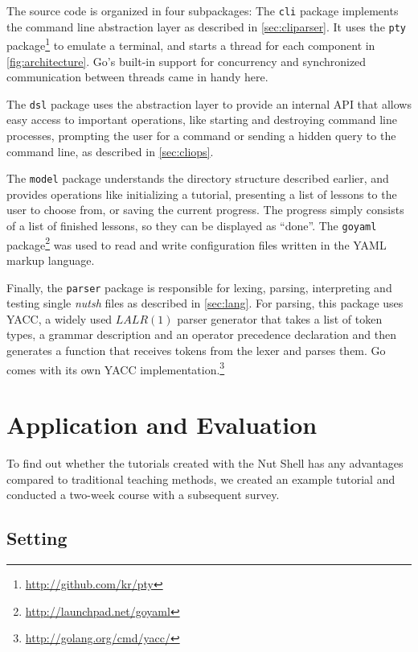 \documentclass[paper=a4,twoside,abstract=on,cleardoublepage=empty,numbers=noenddot,toc=bib,12pt,appendixprefix=true]{scrreprt}
\begin{document}
The source code is organized in four subpackages: The \texttt{cli} package implements the command line abstraction layer as described in \cref{sec:cliparser}. It uses the \texttt{pty} package\footnote{\url{http://github.com/kr/pty}} to emulate a terminal, and starts a thread for each component in \cref{fig:architecture}. Go's built-in support for concurrency and synchronized communication between threads came in handy here.

The \texttt{dsl} package uses the abstraction layer to provide an internal API that allows easy access to important operations, like starting and destroying command line processes, prompting the user for a command or sending a hidden query to the command line, as described in \cref{sec:cliops}.

The \texttt{model} package understands the directory structure described earlier, and provides operations like initializing a tutorial, presenting a list of lessons to the user to choose from, or saving the current progress. The progress simply consists of a list of finished lessons, so they can be displayed as “done”. The \texttt{goyaml} package\footnote{\url{http://launchpad.net/goyaml}} was used to read and write configuration files written in the \textsc{YAML} markup language.

Finally, the \texttt{parser} package is responsible for lexing, parsing, interpreting and testing single \emph{nutsh} files as described in \cref{sec:lang}. For parsing, this package uses \textsc{YACC}, a widely used $LALR(1)$ parser generator that takes a list of token types, a grammar description and an operator precedence declaration and then generates a function that receives tokens from the lexer and parses them. Go comes with its own YACC implementation.\footnote{\url{http://golang.org/cmd/yacc/}}

\chapter{Application and Evaluation}
\label{sec:evaluation}

To find out whether the tutorials created with the Nut Shell has any advantages compared to traditional teaching methods, we created an example tutorial and conducted a two-week course with a subsequent survey.

\section{Setting}
\end{document}
